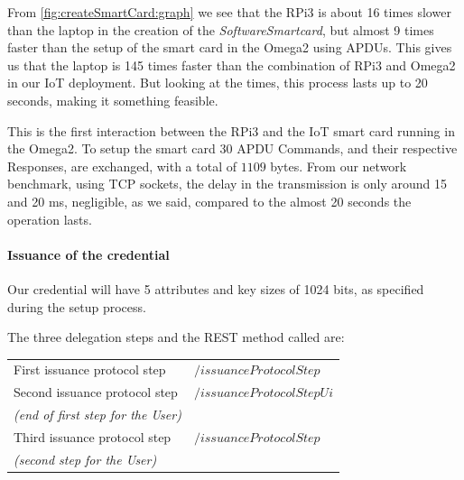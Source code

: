 \documentclass[journal]{IEEEtran}
\begin{document}


From \autoref{fig:createSmartCard:graph} we see that the RPi3 is about 16 times slower than the laptop in the creation of the \textit{SoftwareSmartcard}, but almost 9 times faster than the setup of the smart card in the Omega2 using APDUs. This gives us that the laptop is 145 times faster than the combination of RPi3 and Omega2 in our IoT deployment.
But looking at the times, this process lasts up to 20 seconds, making it something feasible.

This is the first interaction between the RPi3 and the IoT smart card running in the Omega2. To setup the smart card 30 APDU Commands, and their respective Responses, are exchanged, with a total of $1109$ bytes. From our network benchmark, using TCP sockets, the delay in the transmission is only around 15 and 20 ms, negligible, as we said, compared to the almost 20 seconds the operation lasts.


\paragraph{Issuance of the credential}\hfil

Our credential will have 5 attributes and key sizes of 1024 bits, as specified during the setup process.

The three delegation steps and the REST method called are:

\begin{center}
	\begin{tabular}{l|l}
		First issuance protocol step & $/issuanceProtocolStep$ \\
		Second issuance protocol step  & $/issuanceProtocolStepUi$ \\
		\textit{(end of first step for the User)} & \\
		Third issuance protocol step & $/issuanceProtocolStep$ \\
		\textit{(second step for the User)}  & \\
	\end{tabular}
\end{center}


\end{document}

